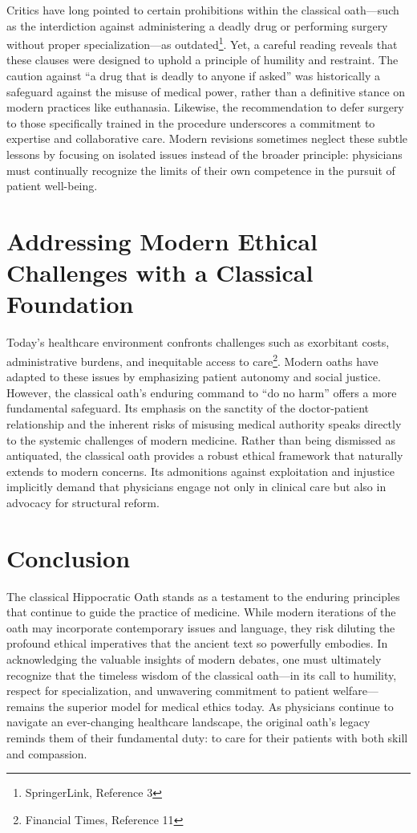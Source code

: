 \documentclass[12pt]{article}
\begin{document}
Critics have long pointed to certain prohibitions within the classical oath—such as the interdiction against administering a deadly drug or performing surgery without proper specialization—as outdated\footnote{SpringerLink, Reference 3}. Yet, a careful reading reveals that these clauses were designed to uphold a principle of humility and restraint. The caution against “a drug that is deadly to anyone if asked” was historically a safeguard against the misuse of medical power, rather than a definitive stance on modern practices like euthanasia. Likewise, the recommendation to defer surgery to those specifically trained in the procedure underscores a commitment to expertise and collaborative care. Modern revisions sometimes neglect these subtle lessons by focusing on isolated issues instead of the broader principle: physicians must continually recognize the limits of their own competence in the pursuit of patient well-being.

\bigskip

\section*{Addressing Modern Ethical Challenges with a Classical Foundation}

Today’s healthcare environment confronts challenges such as exorbitant costs, administrative burdens, and inequitable access to care\footnote{Financial Times, Reference 11}. Modern oaths have adapted to these issues by emphasizing patient autonomy and social justice. However, the classical oath’s enduring command to “do no harm” offers a more fundamental safeguard. Its emphasis on the sanctity of the doctor-patient relationship and the inherent risks of misusing medical authority speaks directly to the systemic challenges of modern medicine. Rather than being dismissed as antiquated, the classical oath provides a robust ethical framework that naturally extends to modern concerns. Its admonitions against exploitation and injustice implicitly demand that physicians engage not only in clinical care but also in advocacy for structural reform.

\bigskip

\section*{Conclusion}

The classical Hippocratic Oath stands as a testament to the enduring principles that continue to guide the practice of medicine. While modern iterations of the oath may incorporate contemporary issues and language, they risk diluting the profound ethical imperatives that the ancient text so powerfully embodies. In acknowledging the valuable insights of modern debates, one must ultimately recognize that the timeless wisdom of the classical oath—in its call to humility, respect for specialization, and unwavering commitment to patient welfare—remains the superior model for medical ethics today. As physicians continue to navigate an ever-changing healthcare landscape, the original oath’s legacy reminds them of their fundamental duty: to care for their patients with both skill and compassion.
\end{document}
